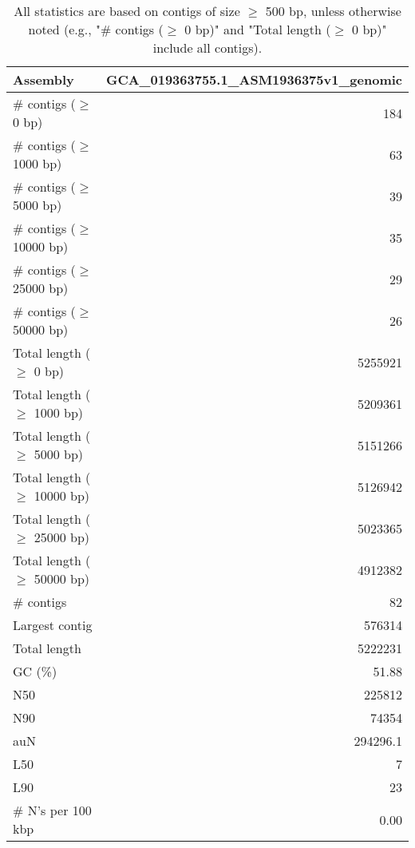 \documentclass[12pt,a4paper]{article}
\begin{document}
\begin{table}[ht]
\begin{center}
\caption{All statistics are based on contigs of size $\geq$ 500 bp, unless otherwise noted (e.g., "\# contigs ($\geq$ 0 bp)" and "Total length ($\geq$ 0 bp)" include all contigs).}
\begin{tabular}{|l*{1}{|r}|}
\hline
Assembly & GCA\_019363755.1\_ASM1936375v1\_genomic \\ \hline
\# contigs ($\geq$ 0 bp) & 184 \\ \hline
\# contigs ($\geq$ 1000 bp) & 63 \\ \hline
\# contigs ($\geq$ 5000 bp) & 39 \\ \hline
\# contigs ($\geq$ 10000 bp) & 35 \\ \hline
\# contigs ($\geq$ 25000 bp) & 29 \\ \hline
\# contigs ($\geq$ 50000 bp) & 26 \\ \hline
Total length ($\geq$ 0 bp) & 5255921 \\ \hline
Total length ($\geq$ 1000 bp) & 5209361 \\ \hline
Total length ($\geq$ 5000 bp) & 5151266 \\ \hline
Total length ($\geq$ 10000 bp) & 5126942 \\ \hline
Total length ($\geq$ 25000 bp) & 5023365 \\ \hline
Total length ($\geq$ 50000 bp) & 4912382 \\ \hline
\# contigs & 82 \\ \hline
Largest contig & 576314 \\ \hline
Total length & 5222231 \\ \hline
GC (\%) & 51.88 \\ \hline
N50 & 225812 \\ \hline
N90 & 74354 \\ \hline
auN & 294296.1 \\ \hline
L50 & 7 \\ \hline
L90 & 23 \\ \hline
\# N's per 100 kbp & 0.00 \\ \hline
\end{tabular}
\end{center}
\end{table}
\end{document}
